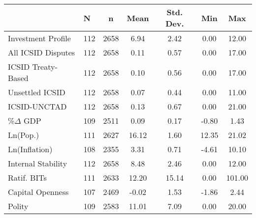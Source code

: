 \begin{table}[ht]
\centering
{\footnotesize
\begin{tabular}{llccccc}
  & N & n & Mean & Std. Dev. & Min & Max \\ 
  \hline
\hline
Investment Profile & 112 & 2658 & 6.94 & 2.42 & 0.00 & 12.00 \\ 
  All ICSID Disputes & 112 & 2658 & 0.11 & 0.57 & 0.00 & 17.00 \\ 
  ICSID Treaty-Based & 112 & 2658 & 0.10 & 0.56 & 0.00 & 17.00 \\ 
  Unsettled ICSID & 112 & 2658 & 0.07 & 0.44 & 0.00 & 11.00 \\ 
  ICSID-UNCTAD & 112 & 2658 & 0.13 & 0.67 & 0.00 & 21.00 \\ 
  \%$\Delta$ GDP & 109 & 2511 & 0.09 & 0.17 & -0.80 & 1.43 \\ 
  Ln(Pop.) & 111 & 2627 & 16.12 & 1.60 & 12.35 & 21.02 \\ 
  Ln(Inflation) & 108 & 2355 & 3.31 & 0.71 & -4.61 & 10.10 \\ 
  Internal Stability & 112 & 2658 & 8.48 & 2.46 & 0.00 & 12.00 \\ 
  Ratif. BITs & 111 & 2633 & 12.20 & 15.14 & 0.00 & 101.00 \\ 
  Capital Openness & 107 & 2469 & -0.02 & 1.53 & -1.86 & 2.44 \\ 
  Polity & 109 & 2583 & 11.01 & 7.09 & 0.00 & 20.00 \\ 
   \hline
\hline
\end{tabular}
}
\end{table}
